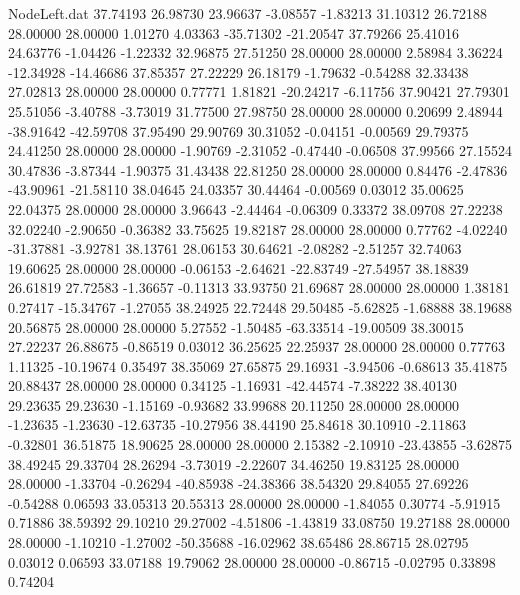 \begin{filecontents}{NodeLeft.dat}
  37.74193   26.98730   23.96637    -3.08557   -1.83213   31.10312   26.72188   28.00000   28.00000    1.01270    4.03363  -35.71302  -21.20547
  37.79266   25.41016   24.63776    -1.04426   -1.22332   32.96875   27.51250   28.00000   28.00000    2.58984    3.36224  -12.34928  -14.46686
  37.85357   27.22229   26.18179    -1.79632   -0.54288   32.33438   27.02813   28.00000   28.00000    0.77771    1.81821  -20.24217   -6.11756
  37.90421   27.79301   25.51056    -3.40788   -3.73019   31.77500   27.98750   28.00000   28.00000    0.20699    2.48944  -38.91642  -42.59708
  37.95490   29.90769   30.31052    -0.04151   -0.00569   29.79375   24.41250   28.00000   28.00000   -1.90769   -2.31052   -0.47440   -0.06508
  37.99566   27.15524   30.47836    -3.87344   -1.90375   31.43438   22.81250   28.00000   28.00000    0.84476   -2.47836  -43.90961  -21.58110
  38.04645   24.03357   30.44464    -0.00569    0.03012   35.00625   22.04375   28.00000   28.00000    3.96643   -2.44464   -0.06309    0.33372
  38.09708   27.22238   32.02240    -2.90650   -0.36382   33.75625   19.82187   28.00000   28.00000    0.77762   -4.02240  -31.37881   -3.92781
  38.13761   28.06153   30.64621    -2.08282   -2.51257   32.74063   19.60625   28.00000   28.00000   -0.06153   -2.64621  -22.83749  -27.54957
  38.18839   26.61819   27.72583    -1.36657   -0.11313   33.93750   21.69687   28.00000   28.00000    1.38181    0.27417  -15.34767   -1.27055
  38.24925   22.72448   29.50485    -5.62825   -1.68888   38.19688   20.56875   28.00000   28.00000    5.27552   -1.50485  -63.33514  -19.00509
  38.30015   27.22237   26.88675    -0.86519    0.03012   36.25625   22.25937   28.00000   28.00000    0.77763    1.11325  -10.19674    0.35497
  38.35069   27.65875   29.16931    -3.94506   -0.68613   35.41875   20.88437   28.00000   28.00000    0.34125   -1.16931  -42.44574   -7.38222
  38.40130   29.23635   29.23630    -1.15169   -0.93682   33.99688   20.11250   28.00000   28.00000   -1.23635   -1.23630  -12.63735  -10.27956
  38.44190   25.84618   30.10910    -2.11863   -0.32801   36.51875   18.90625   28.00000   28.00000    2.15382   -2.10910  -23.43855   -3.62875
  38.49245   29.33704   28.26294    -3.73019   -2.22607   34.46250   19.83125   28.00000   28.00000   -1.33704   -0.26294  -40.85938  -24.38366
  38.54320   29.84055   27.69226    -0.54288    0.06593   33.05313   20.55313   28.00000   28.00000   -1.84055    0.30774   -5.91915    0.71886
  38.59392   29.10210   29.27002    -4.51806   -1.43819   33.08750   19.27188   28.00000   28.00000   -1.10210   -1.27002  -50.35688  -16.02962
  38.65486   28.86715   28.02795     0.03012    0.06593   33.07188   19.79062   28.00000   28.00000   -0.86715   -0.02795    0.33898    0.74204

\end{filecontents}
